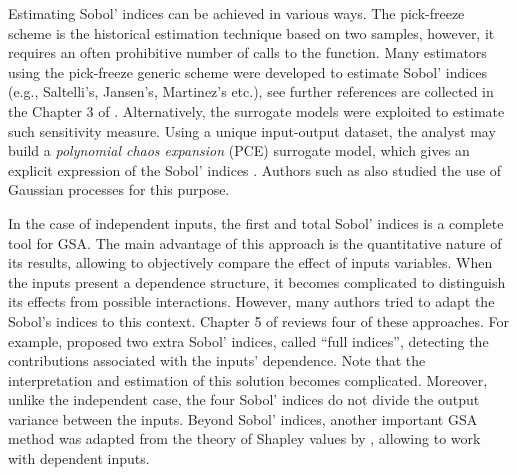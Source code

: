 Estimating Sobol' indices can be achieved in various ways. 
The pick-freeze scheme is the historical estimation technique based on two samples, however, it requires an often prohibitive number of calls to the function. 
Many estimators using the pick-freeze generic scheme were developed to estimate Sobol' indices (e.g., Saltelli's, Jansen's, Martinez's etc.), see further references are collected in the Chapter 3 of \citet{daveiga_iooss_2021}.
Alternatively, the surrogate models were exploited to estimate such sensitivity measure. 
Using a unique input-output dataset, the analyst may build a \textit{polynomial chaos expansion} (PCE) surrogate model, which gives an explicit expression of the Sobol' indices \citep{sudret_2008}.
Authors such as \citet{marrel_2009} also studied the use of Gaussian processes for this purpose. 
  
In the case of independent inputs, the first and total Sobol' indices is a complete tool for GSA. 
The main advantage of this approach is the quantitative nature of its results, allowing to objectively compare the effect of inputs variables. 
When the inputs present a dependence structure, it becomes complicated to distinguish its effects from possible interactions. 
However, many authors tried to adapt the Sobol's indices to this context. 
Chapter 5 of \citet{daveiga_iooss_2021} reviews four of these approaches. 
For example, \citet{mara_tarantola_2012} proposed two extra Sobol' indices, called ``full indices'', detecting the contributions associated with the inputs' dependence. 
Note that the interpretation and estimation of this solution becomes complicated. 
Moreover, unlike the independent case, the four Sobol' indices do not divide the output variance between the inputs.
Beyond Sobol' indices, another important GSA method was adapted from the theory of Shapley values by \citet{owen_2014_shapley}, allowing to work with dependent inputs.   

